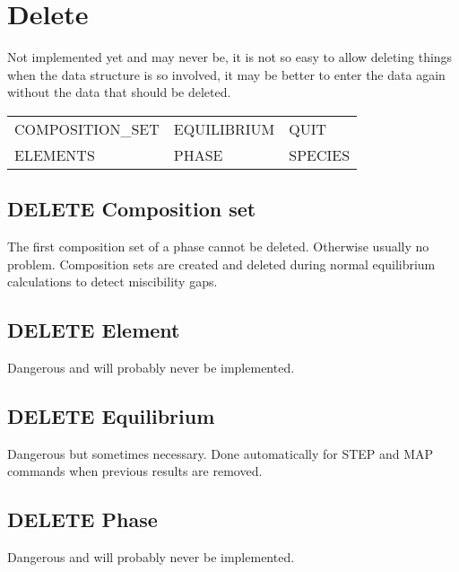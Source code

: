 \documentclass[12pt]{article}
\begin{document}
\section{Delete }

Not implemented yet and may never be, it is not so easy to allow
deleting things when the data structure is so involved, it may be
better to enter the data again without the data that should be
deleted.

\begin{tabular}{lll}
 COMPOSITION\_SET & EQUILIBRIUM &     QUIT\\
 ELEMENTS         & PHASE        &    SPECIES\\
\end{tabular}

\subsection{DELETE Composition set}

The first composition set of a phase cannot be deleted.  Otherwise
usually no problem.  Composition sets are created and deleted during
normal equilibrium calculations to detect miscibility gaps.

\subsection{DELETE Element}

Dangerous and will probably never be implemented.

\subsection{DELETE Equilibrium}

Dangerous but sometimes necessary.  Done automatically for STEP and
MAP commands when previous results are removed.

\subsection{DELETE Phase}

Dangerous and will probably never be implemented.

\end{document}
